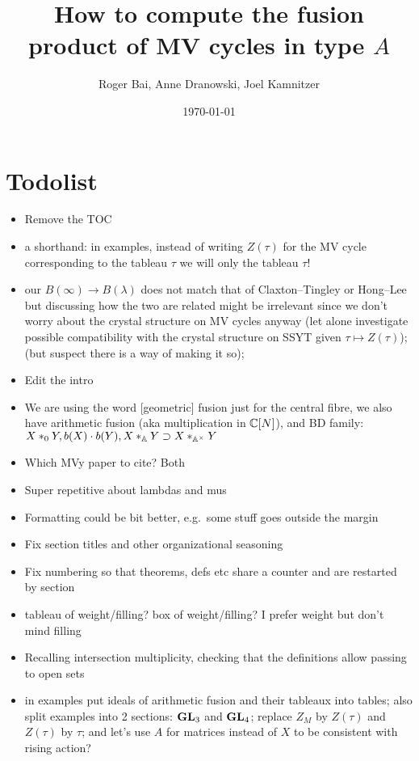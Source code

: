 \documentclass[draft]{article} %
\title{How to compute the fusion product of MV cycles in type $A$}
\author{Roger Bai, Anne Dranowski, Joel Kamnitzer}
\date{\today}
\begin{document}
\maketitle
\tableofcontents

\section{Todolist}
\begin{itemize}
    \item Remove the TOC 
    \item a shorthand: in examples, instead of writing $Z(\tau)$ for the MV cycle corresponding to the tableau $\tau$ we will only the tableau $\tau$!
    \item our $B(\infty) \to B(\lambda)$ does not match that of Claxton--Tingley or Hong--Lee but discussing how the two are related might be irrelevant since we don't worry about the crystal structure on MV cycles anyway (let alone investigate possible compatibility with the crystal structure on SSYT given $\tau\mapsto Z(\tau)$);  (but suspect there is a way of making it so); 
    \item Edit the intro 
    \item We are using the word [geometric] fusion just for the central fibre, we also have arithmetic fusion (aka multiplication in $\mathbb C[N]$), and BD family: $X\ast_{0} Y, b(X) \cdot b(Y), X \ast_{\mathbb A} Y\supset X\ast_{\mathbb A^\times} Y$
    \item[\checkmark] Which MVy paper to cite? Both
    \item Super repetitive about lambdas and mus 
    \item Formatting could be bit better, e.g.\ some stuff goes outside the margin
    \item Fix section titles and other organizational seasoning  
    \item Fix numbering so that theorems, defs etc share a counter and are restarted by section 
    \item tableau of weight/filling? box of weight/filling? I prefer weight but don't mind filling 
    \item Recalling intersection multiplicity, checking that the definitions allow passing to open sets
    \item[\checkmark] in examples put ideals of arithmetic fusion and their tableaux into tables; also split examples into 2 sections: ${\mathbf{GL}}_3$ and ${\mathbf{GL}}_4$; replace $Z_M$ by $Z(\tau)$ and $Z(\tau)$ by $\tau$; and let's use $A$ for matrices instead of $X$ to be consistent with rising action?
\end{itemize}
\end{document}
